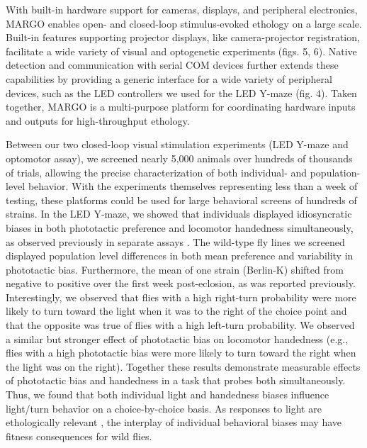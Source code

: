 \documentclass[10pt]{article}
\begin{document}
\begin{multicols}{2}
With built-in hardware support for cameras, displays, and peripheral electronics, MARGO enables open- and closed-loop stimulus-evoked ethology on a large scale. Built-in features supporting projector displays, like camera-projector registration, facilitate a wide variety of visual and optogenetic experiments (figs. 5, 6). Native detection and communication with serial COM devices further extends these capabilities by providing a generic interface for a wide variety of peripheral devices, such as the LED controllers we used for the LED Y-maze (fig. 4). Taken together, MARGO is a multi-purpose platform for coordinating hardware inputs and outputs for high-throughput ethology. 

Between our two closed-loop visual stimulation experiments (LED Y-maze and optomotor assay), we screened nearly 5,000 animals over hundreds of thousands of trials, allowing the precise characterization of both individual- and population-level behavior. With the experiments themselves representing less than a week of testing, these platforms could be used for large behavioral screens of hundreds of strains. In the LED Y-maze, we showed that individuals displayed idiosyncratic biases in both phototactic preference and locomotor handedness simultaneously, as observed previously in separate assays \cite{Kain_Phototactic_2012,Buchanan_Neuronal_2015}. The wild-type fly lines we screened displayed population level differences in both mean preference and variability in phototactic bias\cite{Ayroles_Behavioral_2015}. Furthermore, the mean of one strain (Berlin-K) shifted from negative to positive over the first week post-eclosion, as was reported previously\cite{Chiang_Tactic_1963}. Interestingly, we observed that flies with a high right-turn probability were more likely to turn toward the light when it was to the right of the choice point and that the opposite was true of flies with a high left-turn probability. We observed a similar but stronger effect of phototactic bias on locomotor handedness (e.g., flies with a high phototactic bias were more likely to turn toward the right when the light was on the right). Together these results demonstrate measurable effects of phototactic bias and handedness in a task that probes both simultaneously. Thus, we found that both individual light and handedness biases influence light/turn behavior on a choice-by-choice basis. As responses to light are ethologically relevant \cite{Kain_Variability_2015}, the interplay of individual behavioral biases may have fitness consequences for wild flies.


\end{multicols}
\end{document}
